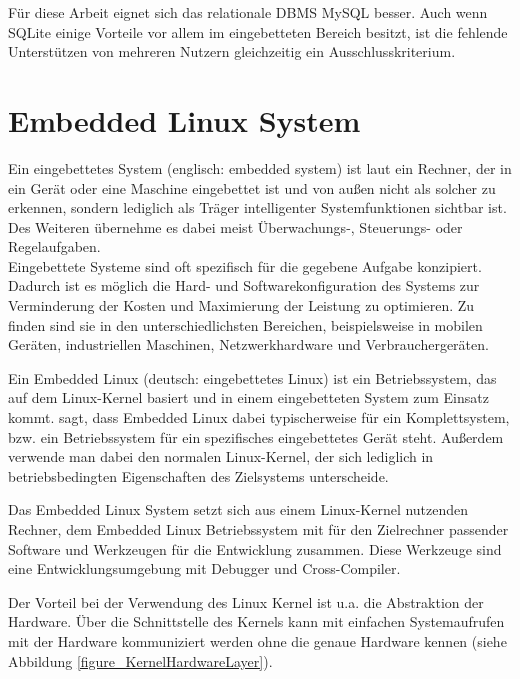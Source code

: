 Für diese Arbeit eignet sich das relationale \ac{DBMS} MySQL besser. Auch wenn SQLite einige Vorteile vor allem im eingebetteten Bereich besitzt, ist die fehlende Unterstützen von mehreren Nutzern gleichzeitig ein Ausschlusskriterium.

\newpage

\section{Embedded Linux System}
\label{section_EmbeddedLinux}

Ein eingebettetes System (englisch: embedded system) ist laut \cite{bender2005embedded} ein Rechner, der in ein Gerät oder eine Maschine eingebettet ist und von außen nicht als solcher zu erkennen, sondern lediglich als Träger intelligenter Systemfunktionen sichtbar ist. Des Weiteren übernehme es dabei meist Überwachungs-, Steuerungs- oder Regelaufgaben.\\
Eingebettete Systeme sind oft spezifisch für die gegebene Aufgabe konzipiert. Dadurch ist es möglich die Hard- und Softwarekonfiguration des Systems zur Verminderung der Kosten und Maximierung der Leistung zu optimieren. Zu finden sind sie in den unterschiedlichsten Bereichen, beispielsweise in mobilen Geräten, industriellen Maschinen, Netzwerkhardware und Verbrauchergeräten.\ 

Ein Embedded Linux (deutsch: eingebettetes Linux) ist ein Betriebssystem, das auf dem Linux-Kernel basiert und in einem eingebetteten System zum Einsatz kommt. \cite{yaghmour2008building} sagt, dass Embedded Linux dabei typischerweise für ein Komplettsystem, bzw. ein Betriebssystem für ein spezifisches eingebettetes Gerät steht. Außerdem verwende man dabei den normalen Linux-Kernel, der sich lediglich in betriebsbedingten Eigenschaften des Zielsystems unterscheide.\ 

Das Embedded Linux System setzt sich aus einem Linux-Kernel nutzenden Rechner, dem Embedded Linux Betriebssystem mit für den Zielrechner passender Software und Werkzeugen für die Entwicklung zusammen. Diese Werkzeuge sind eine Entwicklungsumgebung mit Debugger und Cross-Compiler.

Der Vorteil bei der Verwendung des Linux Kernel ist u.a. die Abstraktion der Hardware. Über die Schnittstelle des Kernels kann mit einfachen Systemaufrufen mit der Hardware kommuniziert werden ohne die genaue Hardware kennen (siehe Abbildung \ref{figure_KernelHardwareLayer}).\\

